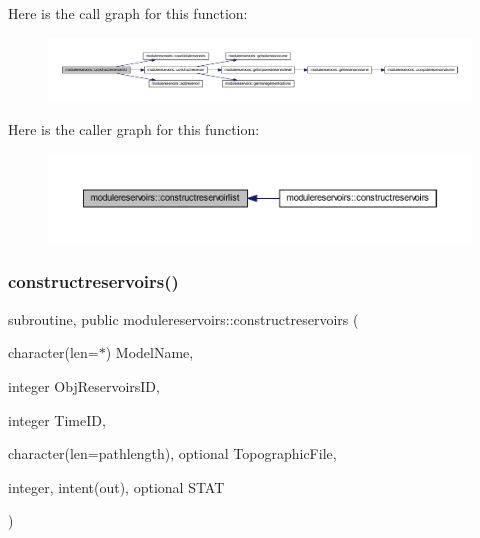 Here is the call graph for this function\+:\nopagebreak
\begin{figure}[H]
\begin{center}
\leavevmode
\includegraphics[width=350pt]{namespacemodulereservoirs_ac7bcb5beebaa4c557e558719e9656911_cgraph}
\end{center}
\end{figure}
Here is the caller graph for this function\+:\nopagebreak
\begin{figure}[H]
\begin{center}
\leavevmode
\includegraphics[width=350pt]{namespacemodulereservoirs_ac7bcb5beebaa4c557e558719e9656911_icgraph}
\end{center}
\end{figure}
\mbox{\label{namespacemodulereservoirs_a8356f95662b41d91816350cf3f3c6113}} 
\subsubsection{\texorpdfstring{constructreservoirs()}{constructreservoirs()}}
{\footnotesize\ttfamily subroutine, public modulereservoirs\+::constructreservoirs (\begin{DoxyParamCaption}\item[{character(len=$\ast$)}]{Model\+Name,  }\item[{integer}]{Obj\+Reservoirs\+ID,  }\item[{integer}]{Time\+ID,  }\item[{character(len=pathlength), optional}]{Topographic\+File,  }\item[{integer, intent(out), optional}]{S\+T\+AT }\end{DoxyParamCaption})}

